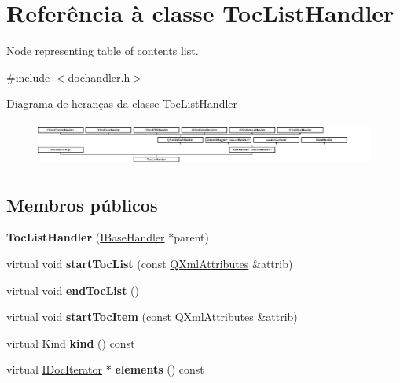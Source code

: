 \hypertarget{class_toc_list_handler}{\section{Referência à classe Toc\-List\-Handler}
\label{class_toc_list_handler}
}


Node representing table of contents list.  




{\ttfamily \#include $<$dochandler.\-h$>$}

Diagrama de heranças da classe Toc\-List\-Handler\begin{figure}[H]
\begin{center}
\leavevmode
\includegraphics[height=1.474654cm]{class_toc_list_handler}
\end{center}
\end{figure}
\subsection*{Membros públicos}
\begin{DoxyCompactItemize}
\item 
\hypertarget{class_toc_list_handler_abffe4f5d19e511d15dd75b75f4a4a8be}{{\bfseries Toc\-List\-Handler} (\hyperlink{class_i_base_handler}{I\-Base\-Handler} $\ast$parent)}\label{class_toc_list_handler_abffe4f5d19e511d15dd75b75f4a4a8be}

\item 
\hypertarget{class_toc_list_handler_a39d504ade0f9685172c4bf0d102aafeb}{virtual void {\bfseries start\-Toc\-List} (const \hyperlink{class_q_xml_attributes}{Q\-Xml\-Attributes} \&attrib)}\label{class_toc_list_handler_a39d504ade0f9685172c4bf0d102aafeb}

\item 
\hypertarget{class_toc_list_handler_a16b1abb3c3a62e202b08ae1adcd6f2f7}{virtual void {\bfseries end\-Toc\-List} ()}\label{class_toc_list_handler_a16b1abb3c3a62e202b08ae1adcd6f2f7}

\item 
\hypertarget{class_toc_list_handler_ae85f3241e4f1b89c59bd04530df4a69f}{virtual void {\bfseries start\-Toc\-Item} (const \hyperlink{class_q_xml_attributes}{Q\-Xml\-Attributes} \&attrib)}\label{class_toc_list_handler_ae85f3241e4f1b89c59bd04530df4a69f}

\item 
\hypertarget{class_toc_list_handler_af8e62c8a81ddf2283205cc8955de50eb}{virtual Kind {\bfseries kind} () const }\label{class_toc_list_handler_af8e62c8a81ddf2283205cc8955de50eb}

\item 
\hypertarget{class_toc_list_handler_a3852144fad03681468c2c73e84c29c30}{virtual \hyperlink{class_i_doc_iterator}{I\-Doc\-Iterator} $\ast$ {\bfseries elements} () const }\label{class_toc_list_handler_a3852144fad03681468c2c73e84c29c30}

\end{DoxyCompactItemize}
